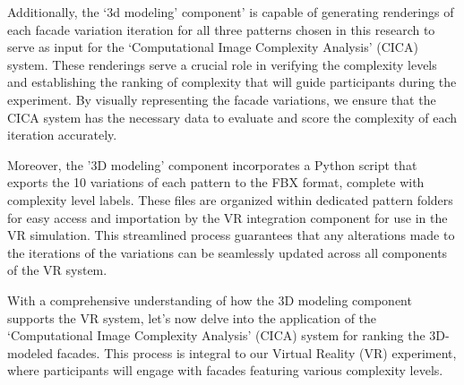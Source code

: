 Additionally, the `3d modeling' component' is capable of generating renderings of each facade variation iteration for all three patterns chosen in this research to serve as input for the `Computational Image Complexity Analysis' (CICA) system.
These renderings serve a crucial role in verifying the complexity levels and establishing the ranking of complexity that will guide participants during the experiment.
By visually representing the facade variations, we ensure that the CICA system has the necessary data to evaluate and score the complexity of each iteration accurately.

Moreover, the '3D modeling' component incorporates a Python script that exports the 10 variations of each pattern to the FBX format, complete with complexity level labels.
These files are organized within dedicated pattern folders for easy access and importation by the VR integration component for use in the VR simulation.
This streamlined process guarantees that any alterations made to the iterations of the variations can be seamlessly updated across all components of the VR system.

With a comprehensive understanding of how the 3D modeling component supports the VR system, let's now delve into the application of the `Computational Image Complexity Analysis' (CICA) system for ranking the 3D-modeled facades.
This process is integral to our Virtual Reality (VR) experiment, where participants will engage with facades featuring various complexity levels.

